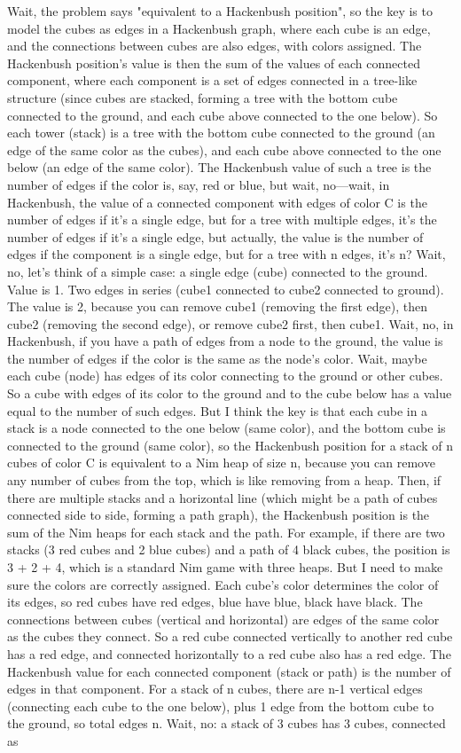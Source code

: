 Wait, the problem says "equivalent to a Hackenbush position", so the key is to model the cubes as edges in a Hackenbush graph, where each cube is an edge, and the connections between cubes are also edges, with colors assigned. The Hackenbush position's value is then the sum of the values of each connected component, where each component is a set of edges connected in a tree-like structure (since cubes are stacked, forming a tree with the bottom cube connected to the ground, and each cube above connected to the one below). So each tower (stack) is a tree with the bottom cube connected to the ground (an edge of the same color as the cubes), and each cube above connected to the one below (an edge of the same color). The Hackenbush value of such a tree is the number of edges if the color is, say, red or blue, but wait, no—wait, in Hackenbush, the value of a connected component with edges of color C is the number of edges if it's a single edge, but for a tree with multiple edges, it's the number of edges if it's a single edge, but actually, the value is the number of edges if the component is a single edge, but for a tree with n edges, it's n? Wait, no, let's think of a simple case: a single edge (cube) connected to the ground. Value is 1. Two edges in series (cube1 connected to cube2 connected to ground). The value is 2, because you can remove cube1 (removing the first edge), then cube2 (removing the second edge), or remove cube2 first, then cube1. Wait, no, in Hackenbush, if you have a path of edges from a node to the ground, the value is the number of edges if the color is the same as the node's color. Wait, maybe each cube (node) has edges of its color connecting to the ground or other cubes. So a cube with edges of its color to the ground and to the cube below has a value equal to the number of such edges. But I think the key is that each cube in a stack is a node connected to the one below (same color), and the bottom cube is connected to the ground (same color), so the Hackenbush position for a stack of n cubes of color C is equivalent to a Nim heap of size n, because you can remove any number of cubes from the top, which is like removing from a heap. Then, if there are multiple stacks and a horizontal line (which might be a path of cubes connected side to side, forming a path graph), the Hackenbush position is the sum of the Nim heaps for each stack and the path. For example, if there are two stacks (3 red cubes and 2 blue cubes) and a path of 4 black cubes, the position is 3 + 2 + 4, which is a standard Nim game with three heaps. But I need to make sure the colors are correctly assigned. Each cube's color determines the color of its edges, so red cubes have red edges, blue have blue, black have black. The connections between cubes (vertical and horizontal) are edges of the same color as the cubes they connect. So a red cube connected vertically to another red cube has a red edge, and connected horizontally to a red cube also has a red edge. The Hackenbush value for each connected component (stack or path) is the number of edges in that component. For a stack of n cubes, there are n-1 vertical edges (connecting each cube to the one below), plus 1 edge from the bottom cube to the ground, so total edges n. Wait, no: a stack of 3 cubes has 3 cubes, connected as 